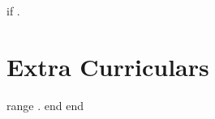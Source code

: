 {{if .}}
\section{Extra Curriculars}
    \resumeItemListStart
    {{range .}} 
    {{end}}
    \resumeItemListEnd
{{end}}